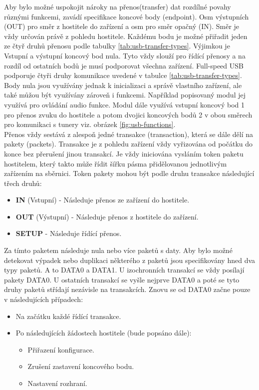 Aby bylo možné uspokojit nároky na přenos(transfer) dat rozdílné povahy různými funkcemi, zavádí specifikace koncové body (endpoint). Osm výstupních (OUT) pro směr z hostitele do zařízení a osm pro směr opačný (IN). Směr je vždy určován právě z pohledu hostitele. Každému bodu je možné přiřadit jeden ze čtyř druhů přenosu podle tabulky \ref{tab:usb-transfer-types}. Výjimkou je  Vstupní a výstupní koncový bod nula. Tyto vždy slouží pro řídící přenosy a na rozdíl od ostatních bodů je musí podporovat všechna zařízení.
Full-speed USB podporuje čtyři druhy komunikace uvedené v tabulce \ref{tab:usb-transfer-types}.\\ 
Body nula jsou využívány jednak k inicializaci a správě vlastního zařízení, ale také můžou být využívány zároveň i funkcemi. Například popisovaný modul jej využívá pro ovládání audio funkce.
Modul dále využívá vstupní koncový bod 1 pro přenos zvuku do hostitele a potom dvojici koncových bodů 2 v obou směrech pro komunikaci s tunery viz. obrázek \ref{fig:usb-functions}.\\
Přenos vždy sestává z alespoň jedné transakce (transaction), která se dále dělí na pakety (packets). Transakce je z pohledu zařízení vždy vyřizována od počátku do konce bez přerušení jinou transakcí. Je vždy iniciována vysláním token paketu hostitelem, který takto může řídit šířku pásma přidělovanou jednotlivým zařízením na sběrnici. Token pakety mohou být podle druhu transakce následující třech druhů:
\begin{itemize}
\item \textbf{IN} (Vstupní) - Následuje přenos ze zařízení do hostitele.
\item \textbf{OUT} (Výstupní) - Následuje přenos z hostitele do zařízení.
\item \textbf{SETUP} - Následuje řídící přenos. %
\end{itemize}
Za tímto paketem následuje nula nebo více paketů s daty. Aby bylo možné detekovat výpadek nebo duplikaci některého z paketů jsou specifikovány hned dva typy paketů. A to DATA0 a DATA1. U izochronních transakcí se vždy posílají pakety DATA0. U ostatních transakcí se vyšle nejprve DATA0 a poté se tyto druhy paketů střídají nezávisle na transakcích. Znovu se od DATA0 začne pouze v následujících případech:
\begin{itemize}
\item Na začátku každé řídící transakce.
\item Po následujících žádostech hostitele (bude popsáno dále):
\begin{itemize}
\item Přiřazení konfigurace.
\item Zrušení zastavení koncového bodu.
\item Nastavení rozhraní.
\end{itemize}
\end{itemize}
